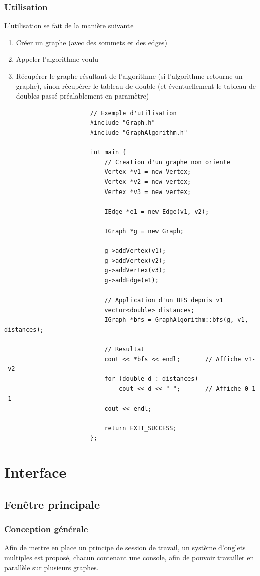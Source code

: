 \documentclass[french]{article}
\begin{document}
			\subsubsection{Utilisation}
			L'utilisation se fait de la manière suivante
			\begin{enumerate}
				\item Créer un graphe (avec des sommets et des edges) 
				\item Appeler l'algorithme voulu
				\item Récupérer le graphe résultant de l'algorithme (si l'algorithme retourne un graphe), sinon récupérer le tableau de double (et éventuellement le tableau de doubles passé préalablement en paramètre)
			\end{enumerate}
			
			\begin{lstlisting}
						// Exemple d'utilisation
						#include "Graph.h"
						#include "GraphAlgorithm.h"
						
						int main {				
							// Creation d'un graphe non oriente
							Vertex *v1 = new Vertex;
							Vertex *v2 = new vertex;
							Vertex *v3 = new vertex;
							
							IEdge *e1 = new Edge(v1, v2);
							
							IGraph *g = new Graph;
							
							g->addVertex(v1);
							g->addVertex(v2);
							g->addVertex(v3);
							g->addEdge(e1);
							
							// Application d'un BFS depuis v1
							vector<double> distances;
							IGraph *bfs = GraphAlgorithm::bfs(g, v1, distances);
							
							// Resultat
							cout << *bfs << endl;		// Affiche v1--v2
							for (double d : distances)	
								cout << d << " ";		// Affiche 0 1 -1
							cout << endl;
							
							return EXIT_SUCCESS;
						};
			\end{lstlisting}
			
	\section{Interface}
		\subsection{Fenêtre principale}
			\subsubsection{Conception générale}
				Afin de mettre en place un principe de session de travail, un système d'onglets multiples est proposé, chacun contenant une console, afin de pouvoir travailler en parallèle sur plusieurs graphes.
\end{document}
